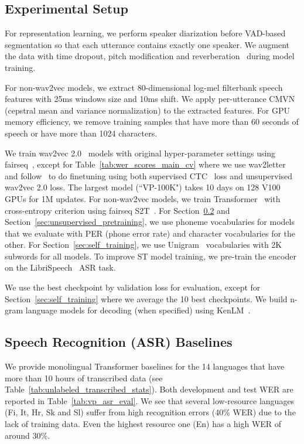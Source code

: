 \documentclass[11pt,a4paper]{article}
\begin{document}
\subsection{Experimental Setup}
For representation learning, we perform speaker diarization before VAD-based segmentation so that each utterance contains exactly one speaker. We augment the data with time dropout, pitch modification and reverberation~\citep{kharitonov2020data} during model training.

For non-wav2vec models, we extract 80-dimensional log-mel filterbank speech features with 25ms windows size and 10ms shift. We apply per-utterance CMVN (cepstral mean and variance normalization) to the extracted features. For GPU memory efficiency, we remove training samples that have more than 60 seconds of speech or have more than 1024 characters.

We train wav2vec 2.0~\citep{baevski2020wav2vec} models with original hyper-parameter settings using fairseq~\citep{ott2019fairseq}, except for Table~\ref{tab:wer_scores_main_cv} where we use wav2letter~\citep{pratap2018w2l} and follow~\citet{talnikar2020joint} to do finetuning using both supervised CTC~\citep{graves2006ctc} loss and unsupervised wav2vec 2.0 loss. The largest model (``VP-100K") takes 10 days on 128 V100 GPUs for 1M updates. For non-wav2vec models, we train Transformer~\citep{NIPS2017_3f5ee243} with cross-entropy criterion using fairseq S2T~\citep{wang2020fairseqs2t}. For Section~\ref{sec:asr_baselines} and Section~\ref{sec:unsupervised_pretraining}, we use phoneme vocabularies for models that we evaluate with PER (phone error rate) and character vocabularies for the other. For Section~\ref{sec:self_training}, we use Unigram~\cite{kudo-richardson-2018-sentencepiece} vocabularies with 2K subwords for all models. To improve ST model training, we pre-train the encoder on the LibriSpeech~\citep{panayotov2015librispeech} ASR task.

We use the best checkpoint by validation loss for evaluation, except for Section~\ref{sec:self_training} where we average the 10 best checkpoints.
We build n-gram language models for decoding (when specified) using KenLM~\citep{heafield2011kenlm}.

\subsection{Speech Recognition (ASR) Baselines}
\label{sec:asr_baselines}

We provide monolingual Transformer baselines for the 14 languages that have more than 10 hours of transcribed data (see Table~\ref{tab:unlabeled_transcribed_stats}). Both development and test WER are reported in Table~\ref{tab:vp_asr_eval}. We see that several low-resource languages (Fi, It, Hr, Sk and Sl) suffer from high recognition errors (40\% WER) due to the lack of training data. Even the highest resource one (En) has a high WER of around 30\%.
\end{document}
